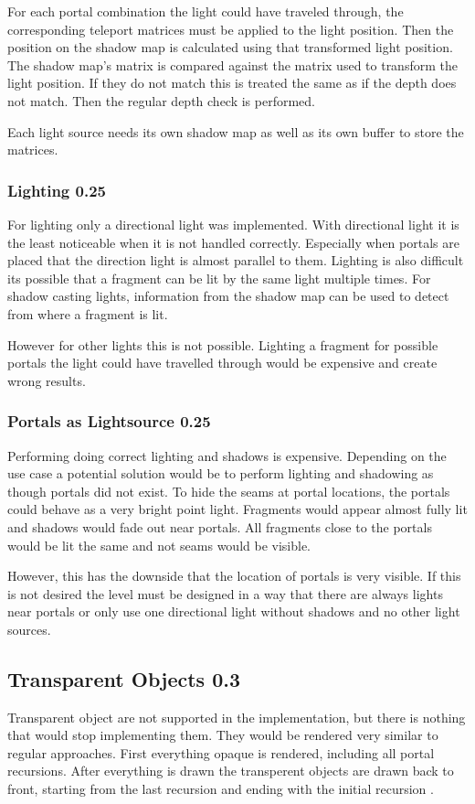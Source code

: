 For each portal combination the light could have traveled through, the corresponding teleport matrices must be applied to the light position.  Then the position on the shadow map is calculated using that transformed light position. The shadow map's matrix is compared against the matrix used to transform the light position. If they do not match this is treated the same as if the depth does not match. Then the regular depth check is performed.

Each light source needs its own shadow map as well as its own buffer to store the matrices.

\subsubsection{Lighting 0.25}
For lighting only a directional light was implemented. With directional light it is the least noticeable when it is not handled correctly. Especially when portals are placed that the direction light is almost parallel to them.
Lighting is also difficult its possible that a fragment can be lit by the same light multiple times. For shadow casting lights, information from the shadow map can be used to detect from where a fragment is lit.

However for other lights this is not possible. Lighting a fragment for possible portals the light could have travelled through would be expensive and create wrong results.


\subsubsection{Portals as Lightsource 0.25}
\label{section:portalsaslights}
Performing doing correct lighting and shadows is expensive. Depending on the use case a potential solution would be to perform lighting and shadowing as though portals did not exist. To hide the seams at portal locations, the portals could behave as a very bright point light. Fragments would appear almost fully lit and shadows would fade out near portals. All fragments close to the portals would be lit the same and not seams would be visible.

However, this has the downside that the location of portals is very visible. If this is not desired the level must be designed in a way that there are always lights near portals or only use one directional light without shadows and no other light sources.


\subsection{Transparent Objects 0.3}
Transparent object are not supported in the implementation, but there is nothing that would stop implementing them. They would be rendered very similar to regular approaches. First everything opaque is rendered, including all portal recursions. After everything is drawn the transperent objects are drawn back to front, starting from the last recursion and ending with the initial recursion \cite{lecture:portalProblems}.

